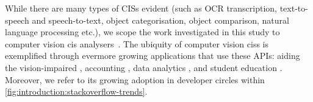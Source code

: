 While there are many types of \glspl{CIS} evident (such as OCR transcription, text-to-speech and speech-to-text, object categorisation, object comparison, natural language processing etc.), we scope the work investigated in this study to computer vision \gls{cis} analysers~\citep{GoogleCloud:Home,Azure:Home,AWS:Home,Pixlab:Home,IBM:Home,Cloudsight:Home,Clarifai:Home,DeepAI:Home,Imagaa:Home,Talkwaler:Home,Kairos:Home,Cognitec:Home,Affectiva:Home}. The ubiquity of computer vision \glspl{cis} is exemplified through evermore growing applications that use these APIs: aiding the vision-impaired \citep{Reis:2018cp,daMotaSilveira:2017vp}, accounting  \citep{Marshall:2018uj}, data analytics \citep{Iyengar:2017fb}, and student education \citep{Dibia:2017iy}. Moreover, we refer to its growing adoption in developer circles within \cref{fig:introduction:stackoverflow-trends}.